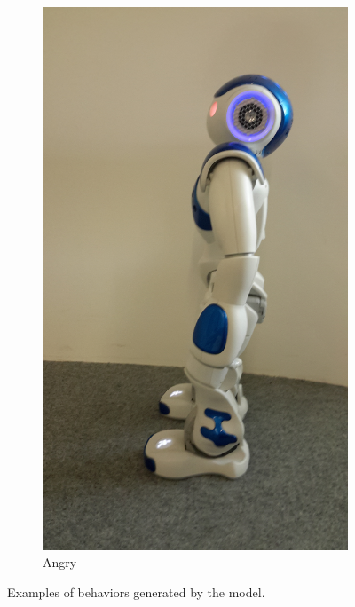 \documentclass[a4paper, 10pt, conference]{ieeeconf}      %
\begin{document}
\begin{figure}
        \begin{subfigure}[b]{0.18\textwidth}
                \includegraphics[width=\textwidth]{../dissertation/figures/angry.jpg}
                \caption{Angry}
                \label{fig:angry}
        \end{subfigure}
		\caption{Examples of behaviors generated by the model.}\label{fig:behaviours}
\end{figure}
\end{document}
